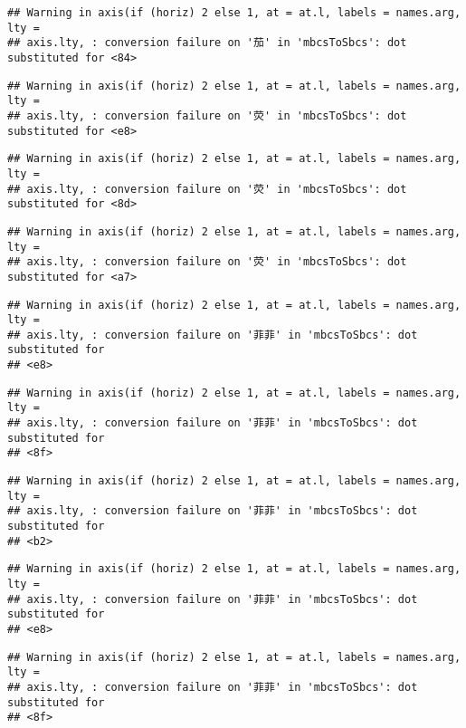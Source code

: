 \documentclass[
]{article}
\begin{document}
\begin{verbatim}
## Warning in axis(if (horiz) 2 else 1, at = at.l, labels = names.arg, lty =
## axis.lty, : conversion failure on '茄' in 'mbcsToSbcs': dot substituted for <84>
\end{verbatim}

\begin{verbatim}
## Warning in axis(if (horiz) 2 else 1, at = at.l, labels = names.arg, lty =
## axis.lty, : conversion failure on '荧' in 'mbcsToSbcs': dot substituted for <e8>
\end{verbatim}

\begin{verbatim}
## Warning in axis(if (horiz) 2 else 1, at = at.l, labels = names.arg, lty =
## axis.lty, : conversion failure on '荧' in 'mbcsToSbcs': dot substituted for <8d>
\end{verbatim}

\begin{verbatim}
## Warning in axis(if (horiz) 2 else 1, at = at.l, labels = names.arg, lty =
## axis.lty, : conversion failure on '荧' in 'mbcsToSbcs': dot substituted for <a7>
\end{verbatim}

\begin{verbatim}
## Warning in axis(if (horiz) 2 else 1, at = at.l, labels = names.arg, lty =
## axis.lty, : conversion failure on '菲菲' in 'mbcsToSbcs': dot substituted for
## <e8>
\end{verbatim}

\begin{verbatim}
## Warning in axis(if (horiz) 2 else 1, at = at.l, labels = names.arg, lty =
## axis.lty, : conversion failure on '菲菲' in 'mbcsToSbcs': dot substituted for
## <8f>
\end{verbatim}

\begin{verbatim}
## Warning in axis(if (horiz) 2 else 1, at = at.l, labels = names.arg, lty =
## axis.lty, : conversion failure on '菲菲' in 'mbcsToSbcs': dot substituted for
## <b2>
\end{verbatim}

\begin{verbatim}
## Warning in axis(if (horiz) 2 else 1, at = at.l, labels = names.arg, lty =
## axis.lty, : conversion failure on '菲菲' in 'mbcsToSbcs': dot substituted for
## <e8>
\end{verbatim}

\begin{verbatim}
## Warning in axis(if (horiz) 2 else 1, at = at.l, labels = names.arg, lty =
## axis.lty, : conversion failure on '菲菲' in 'mbcsToSbcs': dot substituted for
## <8f>
\end{verbatim}
\end{document}
